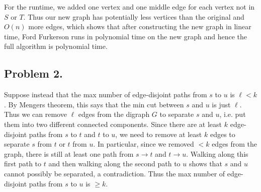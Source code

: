 \documentclass[12pt]{article}
\theoremstyle{definitionstyle}
\begin{document}
    For the runtime, we added one vertex and one middle edge for each vertex not in $S$ or $T$. Thus our new graph has potentially less vertices than the original and $O(n)$ more edges, which shows that after constructing the new graph in linear time, Ford Furkerson runs in polynomial time on the new graph and hence the full algorithm is polynomial time. 

    \subsection*{Problem 2.}
    Suppose instead that the max number of edge-disjoint paths from $s$ to $u$ is $\ell < k$. By Mengers theorem, this says that the min cut between $s$ and $u$ is just $\ell$. Thus we can remove $\ell$ edges from the digraph $G$ to separate $s$ and $u$, i.e. put them into two different connected components. Since there are at least $k$ edge-disjoint paths from $s$ to $t$ and $t$ to $u$, we need to remove at least $k$ edges to separate $s$ from $t$ or $t$ from $u$. In particular, since we removed $<k$ edges from the graph, there is still at least one path from $s \to t$ and $t \to u$. Walking along this first path to $t$ and then walking along the second path to $u$ shows that $s$ and $u$ cannot possibly be separated, a contradiction. Thus the max number of edge-disjoint paths from $s$ to $u$ is $\geq k$.
\end{document}

